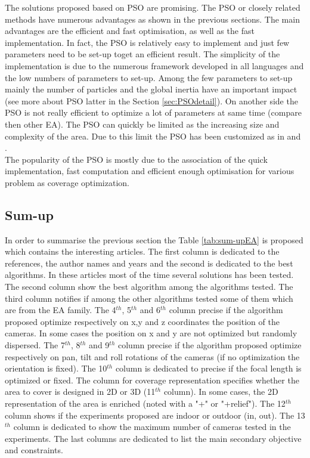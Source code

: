 The solutions proposed based on PSO are promising. The PSO or closely related methods have numerous advantages as shown in the previous sections.
 The main advantages are the efficient and fast optimisation, as well as the fast implementation. In fact, the PSO is  relatively easy to implement and just few parameters need to be set-up toget an efficient result. The simplicity of the implementation is due to the numerous framework developed in all languages and the low numbers of parameters to set-up. Among the  few parameters to set-up mainly the number of particles and the global inertia have an important impact (see more about PSO latter in the Section  \ref{sec:PSOdetail}).
  On another side the PSO is not really efficient to optimize a lot of parameters at same time (compare then other EA). The PSO can quickly be limited as the increasing size and complexity of the area.
   Due to this limit the PSO has been customized as in \citep{143*maji2015}  and \citep{194*fu2010}. \\
The popularity of the PSO is mostly due to the association of the quick implementation, fast computation and efficient enough optimisation for various problem as coverage optimization.
 
 \subsection{Sum-up} 
 In order to summarise the previous section the Table \ref{tab:sum-upEA} is proposed which contains the interesting articles.
 The first column  is dedicated to the references, the author names and years and
  the second is dedicated to the best algorithms. In these articles most of the time several solutions has been tested. The second column show the best algorithm among the algorithms tested. The third column notifies if among the other algorithms tested some of them which are from the EA  family. The 4$^{th}$,  5$^{th}$ and 6$^{th}$ column precise if the algorithm proposed optimize respectively on x,y and z coordinates the position of the cameras. In some cases the position on x and y are not optimized  but randomly dispersed. The 7$^{th}$,  8$^{th}$ and 9$^{th}$ column precise if the algorithm proposed optimize respectively on pan, tilt and roll rotations of the cameras (if no optimization the orientation is fixed). The 10$^{th}$ column is dedicated to precise if the focal length is optimized or fixed. The column for coverage representation specifies whether the area to cover is designed in  2D or 3D (11$^{th}$ column). In some cases, the 2D representation of the area is enriched (noted with a "+" or "+relief"). The 12$^{th}$  column shows if the experiments proposed are indoor or outdoor (in, out). The 13$^{th}$  column is dedicated to show the maximum number of cameras tested in the experiments.  
 The last columns are  dedicated to list the main secondary objective and constraints. 
  
